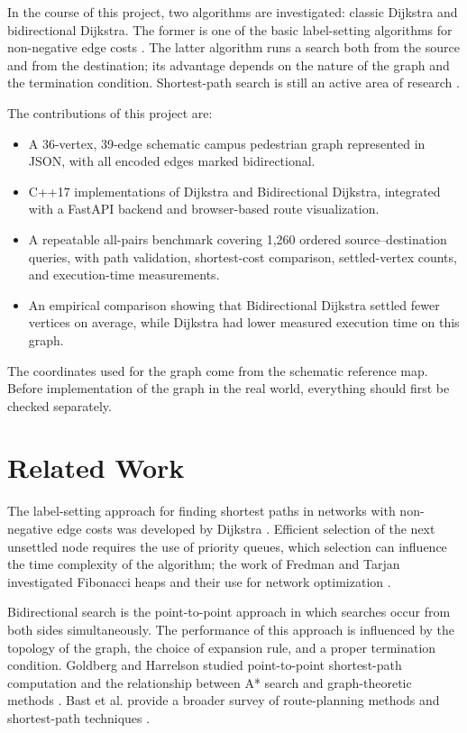 \documentclass[conference]{IEEEtran}
\begin{document}
In the course of this project, two algorithms are investigated: classic Dijkstra and bidirectional Dijkstra. The former is one of the basic label-setting algorithms for non-negative edge costs \cite{dijkstra1959}. The latter algorithm runs a search both from the source and from the destination; its advantage depends on the nature of the graph and the termination condition. Shortest-path search is still an active area of research \cite{goldberg2005}.

The contributions of this project are:
\begin{itemize}
    \item A 36-vertex, 39-edge schematic campus pedestrian graph represented in JSON, with all encoded edges marked bidirectional.
    \item C++17 implementations of Dijkstra and Bidirectional Dijkstra, integrated with a FastAPI backend and browser-based route visualization.
    \item A repeatable all-pairs benchmark covering 1,260 ordered source--destination queries, with path validation, shortest-cost comparison, settled-vertex counts, and execution-time measurements.
    \item An empirical comparison showing that Bidirectional Dijkstra settled fewer vertices on average, while Dijkstra had lower measured execution time on this graph.
\end{itemize}

The coordinates used for the graph come from the schematic reference map. Before implementation of the graph in the real world, everything should first be checked separately.

\section{Related Work}
The label-setting approach for finding shortest paths in networks with non-negative edge costs was developed by Dijkstra \cite{dijkstra1959}. Efficient selection of the next unsettled node requires the use of priority queues, which selection can influence the time complexity of the algorithm; the work of Fredman and Tarjan investigated Fibonacci heaps and their use for network optimization \cite{fredman1987}.

Bidirectional search is the point-to-point approach in which searches occur from both sides simultaneously. The performance of this approach is influenced by the topology of the graph, the choice of expansion rule, and a proper termination condition. Goldberg and Harrelson studied point-to-point shortest-path computation and the relationship between A* search and graph-theoretic methods \cite{goldberg2005}. Bast et al. provide a broader survey of route-planning methods and shortest-path techniques \cite{bast2016}.
\end{document}
